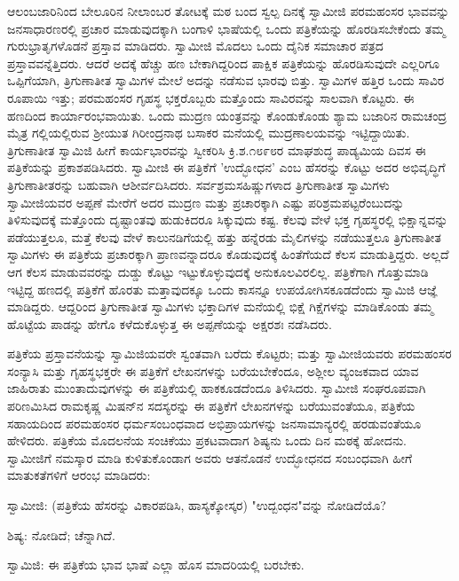 ಆಲಂಬಜಾರಿನಿಂದ ಬೇಲೂರಿನ ನೀಲಾಂಬರ ತೋಟಕ್ಕೆ ಮಠ ಬಂದ ಸ್ವಲ್ಪ ದಿನಕ್ಕೆ ಸ್ವಾಮೀಜಿ ಪರಮಹಂಸರ ಭಾವವನ್ನು ಜನಸಾಧಾರಣರಲ್ಲಿ ಪ್ರಚಾರ ಮಾಡುವುದಕ್ಕಾಗಿ ಬಂಗಾಳಿ ಭಾಷೆಯಲ್ಲಿ ಒಂದು ಪತ್ರಿಕೆಯನ್ನು ಹೊರಡಿಸಬೇಕೆಂದು ತಮ್ಮ ಗುರುಭ್ರಾತೃಗಳೊಡನೆ ಪ್ರಸ್ತಾವ ಮಾಡಿದರು. ಸ್ವಾಮೀಜಿ ಮೊದಲು ಒಂದು ದೈನಿಕ ಸಮಾಚಾರ ಪತ್ರದ ಪ್ರಸ್ತಾವವನ್ನೆತ್ತಿದರು. ಆದರೆ ಅದಕ್ಕೆ ಹೆಚ್ಚು ಹಣ ಬೇಕಾಗಿದ್ದರಿಂದ ಪಾಕ್ಷಿಕ ಪತ್ರಿಕೆಯನ್ನು ಹೊರಡಿಸುವುದೇ ಎಲ್ಲರಿಗೂ ಒಪ್ಪಿಗೆಯಾಗಿ, ತ್ರಿಗುಣಾತೀತ ಸ್ವಾಮಿಗಳ ಮೇಲೆ ಅದನ್ನು ನಡೆಸುವ ಭಾರವು ಬಿತ್ತು. ಸ್ವಾಮಿಗಳ ಹತ್ತಿರ ಒಂದು ಸಾವಿರ ರೂಪಾಯಿ ಇತ್ತು; ಪರಮಹಂಸರ ಗೃಹಸ್ಥ ಭಕ್ತರೊಬ್ಬರು ಮತ್ತೊಂದು ಸಾವಿರವನ್ನು ಸಾಲವಾಗಿ ಕೊಟ್ಟರು. ಈ ಹಣದಿಂದ ಕಾರ್ಯಾರಂಭವಾಯಿತು. ಒಂದು ಮುದ್ರಣ ಯಂತ್ರವನ್ನು ಕೊಂಡುಕೊಂಡು ಶ್ಯಾಮ ಬಜಾರಿನ ರಾಮಚಂದ್ರ ಮೈತ್ರ ಗಲ್ಲಿಯಲ್ಲಿರುವ ಶ‍್ರೀಯುತ ಗಿರೀಂದ್ರನಾಥ ಬಸಾಕರ ಮನೆಯಲ್ಲಿ ಮುದ್ರಣಾಲಯವನ್ನು ಇಟ್ಟಿದ್ದಾಯಿತು. ತ್ರಿಗುಣಾತೀತ ಸ್ವಾಮಿಜಿ ಹೀಗೆ ಕಾರ್ಯಭಾರವನ್ನು ಸ್ವೀಕರಿಸಿ ಕ್ರಿ.ಶ.೧೮೯೮ರ ಮಾಘಶುದ್ಧ ಪಾಡ್ಯಮಿಯ ದಿವಸ ಈ ಪತ್ರಿಕೆಯನ್ನು ಪ್ರಕಾಶಪಡಿಸಿದರು. ಸ್ವಾಮೀಜಿ ಈ ಪತ್ರಿಕೆಗೆ 'ಉದ್ಭೋಧನ' ಎಂಬ ಹೆಸರನ್ನು ಕೊಟ್ಟು ಅದರ ಅಭಿವೃದ್ಧಿಗೆ ತ್ರಿಗುಣಾತೀತರನ್ನು ಬಹುವಾಗಿ ಆಶೀರ್ವದಿಸಿದರು. ಸರ್ವಶ್ರಮಸಹಿಷ್ಣುಗಳಾದ ತ್ರಿಗುಣಾತೀತ ಸ್ವಾಮಿಗಳು ಸ್ವಾಮೀಜಿಯವರ ಅಪ್ಪಣೆ ಮೇರೆಗೆ ಅದರ ಮುದ್ರಣ ಮತ್ತು ಪ್ರಚಾರಕ್ಕಾಗಿ ಎಷ್ಟು ಪರಿಶ್ರಮಪಟ್ಟರೆಂಬುದನ್ನು ತಿಳಿಸುವುದಕ್ಕೆ ಮತ್ತೊಂದು ದೃಷ್ಟಾಂತವು ಹುಡುಕಿದರೂ ಸಿಕ್ಕುವುದು ಕಷ್ಟ. ಕೆಲವು ವೇಳೆ ಭಕ್ತ ಗೃಹಸ್ಥರಲ್ಲಿ ಭಿಕ್ಷಾನ್ನವನ್ನು ಪಡೆಯುತ್ತಲೂ, ಮತ್ತೆ ಕೆಲವು ವೇಳೆ ಕಾಲುನಡಿಗೆಯಲ್ಲಿ ಹತ್ತು ಹನ್ನೆರಡು ಮೈಲಿಗಳನ್ನು ನಡೆಯುತ್ತಲೂ ತ್ರಿಗುಣಾತೀತ ಸ್ವಾಮಿಗಳು ಈ ಪತ್ರಿಕೆಯ ಪ್ರಚಾರಕ್ಕಾಗಿ ಪ್ರಾಣವನ್ನಾದರೂ ಕೊಡುವುದಕ್ಕೆ ಹಿಂತೆಗೆಯದೆ ಕೆಲಸ ಮಾಡುತ್ತಿದ್ದರು. ಅಲ್ಲದೆ ಆಗ ಕೆಲಸ ಮಾಡುವವರನ್ನು ದುಡ್ಡು ಕೊಟ್ಟು ಇಟ್ಟುಕೊಳ್ಳುವುದಕ್ಕೆ ಅನುಕೂಲವಿರಲಿಲ್ಲ. ಪತ್ರಿಕೆಗಾಗಿ ಗೊತ್ತುಮಾಡಿ ಇಟ್ಟಿದ್ದ ಹಣದಲ್ಲಿ ಪತ್ರಿಕೆಗೆ ಹೊರತು ಮತ್ತಾವುದಕ್ಕೂ ಒಂದು ಕಾಸನ್ನೂ ಉಪಯೋಗಿಸಕೂಡದೆಂದು ಸ್ವಾಮಿಜಿ ಆಜ್ಞೆ ಮಾಡಿದ್ದರು. ಆದ್ದರಿಂದ ತ್ರಿಗುಣಾತೀತ ಸ್ವಾಮಿಗಳು ಭಕ್ತಾದಿಗಳ ಮನೆಯಲ್ಲಿ ಭಿಕ್ಷೆ ಗಿಕ್ಷೆಗಳನ್ನು ಮಾಡಿಕೊಂಡು ತಮ್ಮ ಹೊಟ್ಟೆಯ ಪಾಡನ್ನು ಹೇಗೊ ಕಳೆದುಕೊಳ್ಳುತ್ತ ಈ ಅಪ್ಪಣೆಯನ್ನು ಅಕ್ಷರಶಃ ನಡೆಸಿದರು.

ಪತ್ರಿಕೆಯ ಪ್ರಸ್ತಾವನೆಯನ್ನು ಸ್ವಾಮಿಜಿಯವರೇ ಸ್ವಂತವಾಗಿ ಬರೆದು ಕೊಟ್ಟರು; ಮತ್ತು ಸ್ವಾಮೀಜಿಯವರು ಪರಮಹಂಸರ ಸಂನ್ಯಾಸಿ ಮತ್ತು ಗೃಹಸ್ಥಭಕ್ತರೇ ಈ ಪತ್ರಿಕೆಗೆ ಲೇಖನಗಳನ್ನು ಬರೆಯಬೇಕೆಂದೂ, ಅಶ್ಲೀಲ ವ್ಯಂಜಕವಾದ ಯಾವ ಜಾಹಿರಾತು ಮುಂತಾದುವುಗಳನ್ನು ಈ ಪತ್ರಿಕೆಯಲ್ಲಿ ಹಾಕಕೂಡದೆಂದೂ ತಿಳಿಸಿದರು. ಸ್ವಾಮೀಜಿ ಸಂಘರೂಪವಾಗಿ ಪರಿಣಮಿಸಿದ ರಾಮಕೃಷ್ಣ ಮಿಷನ್‌ನ ಸದಸ್ಯರನ್ನು ಈ ಪತ್ರಿಕೆಗೆ ಲೇಖನಗಳನ್ನು ಬರೆಯುವಂತೆಯೂ, ಪತ್ರಿಕೆಯ ಸಹಾಯದಿಂದ ಪರಮಹಂಸರ ಧರ್ಮಸಂಬಂಧವಾದ ಅಭಿಪ್ರಾಯಗಳನ್ನು ಜನಸಾಮಾನ್ಯರಲ್ಲಿ ಹರಡುವಂತೆಯೂ ಹೇಳಿದರು. ಪತ್ರಿಕೆಯ ಮೊದಲನೆಯ ಸಂಚಿಕೆಯು ಪ್ರಕಟವಾದಾಗ ಶಿಷ್ಯನು ಒಂದು ದಿನ ಮಠಕ್ಕೆ ಹೋದನು. ಸ್ವಾಮೀಜಿಗೆ ನಮಸ್ಕಾರ ಮಾಡಿ ಕುಳಿತುಕೊಂಡಾಗ ಅವರು ಆತನೊಡನೆ ಉದ್ಭೋಧನದ ಸಂಬಂಧವಾಗಿ ಹೀಗೆ ಮಾತುಕತೆಗಳಿಗೆ ಆರಂಭ ಮಾಡಿದರು:

ಸ್ವಾಮೀಜಿ: (ಪತ್ರಿಕೆಯ ಹೆಸರನ್ನು ವಿಕಾರಪಡಿಸಿ, ಹಾಸ್ಯಕ್ಕೋಸ್ಕರ) "ಉದ್ಬಂಧನ"ವನ್ನು ನೋಡಿದೆಯೊ?

ಶಿಷ್ಯ: ನೋಡಿದೆ; ಚೆನ್ನಾಗಿದೆ.

ಸ್ವಾಮಿಜಿ: ಈ ಪತ್ರಿಕೆಯ ಭಾವ ಭಾಷೆ ಎಲ್ಲಾ ಹೊಸ ಮಾದರಿಯಲ್ಲಿ ಬರಬೇಕು.

